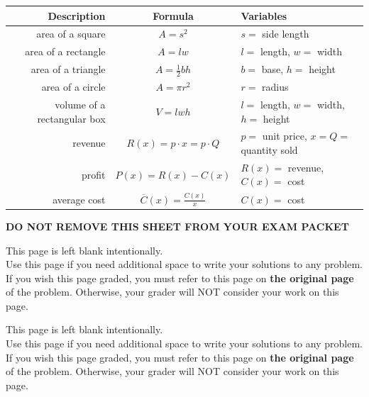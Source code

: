 \documentclass[11pt]{article}
\begin{document}
\begin{enumerate}
\begin{center}
    \begin{tabular}{ r | c | l }
    {\bf Description} & {\bf Formula} & {\bf Variables}\\
    \hline
    area of a square & $A=s^2$ & $s=$ side length\\
    \hline
    area of a rectangle & $A=lw$ & $l=$ length, $w=$ width\\
    \hline
    area of a triangle & $A=\frac12bh$ & $b=$ base, $h=$ height\\
    \hline
    area of a circle & $A=\pi r^2$ & $r=$ radius\\
    \hline
    volume of a rectangular box & $V=lwh$ & $l=$ length, $w=$ width, $h=$ height\\
    \hline
    revenue & $R(x) = p\cdot x = p\cdot Q$ & $p=$ unit price, $x=Q=$ quantity sold\\
    \hline
    profit & $P(x) = R(x) - C(x)$ & $R(x)=$ revenue, $C(x)=$ cost\\
    \hline
    average cost & $\overline C(x) = \frac{C(x)}{x}$ & $C(x)=$ cost\\
    \end{tabular}
\end{center}

\begin{center}
{\bf DO NOT REMOVE THIS SHEET FROM YOUR EXAM PACKET}
\end{center}

\newpage

This page is left blank intentionally.\\

Use this page if you need additional space to write your solutions to any problem. \\

If you wish this page graded, you must refer to this page on \textbf{the original page} of the problem. Otherwise, your grader will NOT consider your work on this page.

\newpage

This page is left blank intentionally.\\

Use this page if you need additional space to write your solutions to any problem. \\

If you wish this page graded, you must refer to this page on \textbf{the original page} of the problem. Otherwise, your grader will NOT consider your work on this page.

\end{enumerate}
\end{document}
